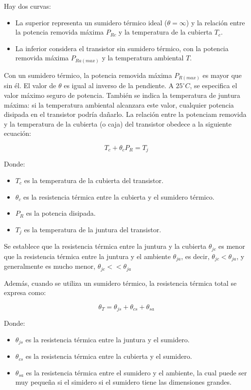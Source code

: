 Hay dos curvas:
\begin{itemize}
	\item La superior representa un sumidero térmico ideal (\(\theta = \infty\)) y la relación entre la potencia removida máxima \( P_{Rc} \) y la temperatura de la cubierta \( T_c \).
	\item La inferior considera el transistor sin sumidero térmico, con la potencia removida máxima \( P_{Ra(max)} \) y la temperatura ambiental \( T \).
\end{itemize}

Con un sumidero térmico, la potencia removida máxima \( P_{R(max)} \) es mayor que sin él. El valor de \( \theta \) es igual al inverso de la pendiente. A \( 25^\circ C \), se especifica el valor máximo seguro de potencia. También se indica la temperatura de juntura máxima: si la temperatura ambiental alcanzara este valor, cualquier potencia disipada en el transistor podría dañarlo. La relación entre la potenciam removida y la temperatura de la cubierta (o caja) del transistor obedece a la siguiente ecuación:

\begin{equation}
	T_c + \theta_c P_R = T_j
\end{equation}

Donde:
\begin{itemize}
	\item \(T_c\) es la temperatura de la cubierta del transistor.
	\item \(\theta_c\) es la resistencia térmica entre la cubierta y el sumidero térmico.
	\item \(P_R\) es la potencia disipada.
	\item \(T_j\) es la temperatura de la juntura del transistor.
\end{itemize}

Se establece que la resistencia térmica entre la juntura y la cubierta \(\theta_{jc}\) es menor que la resistencia térmica entre la juntura y el ambiente \(\theta_{ja}\), es decir, \( \theta_{jc} < \theta_{ja} \), y generalmente es mucho menor,  \( \theta_{jc} << \theta_{ja} \)

Además, cuando se utiliza un sumidero térmico, la resistencia térmica total se expresa como:

\[
\theta_T = \theta_{js} + \theta_{cs} + \theta_{sa}
\]

Donde:
\begin{itemize}
	\item \(\theta_{js}\) es la resistencia térmica entre la juntura y el sumidero.
	\item \(\theta_{cs}\) es la resistencia térmica entre la cubierta y el sumidero.
	\item \(\theta_{sa}\) es la resistencia térmica entre el sumidero y el ambiente, la cual puede ser muy pequeña si el simidero si el sumidero tiene las dimensiones grandes.
\end{itemize}

